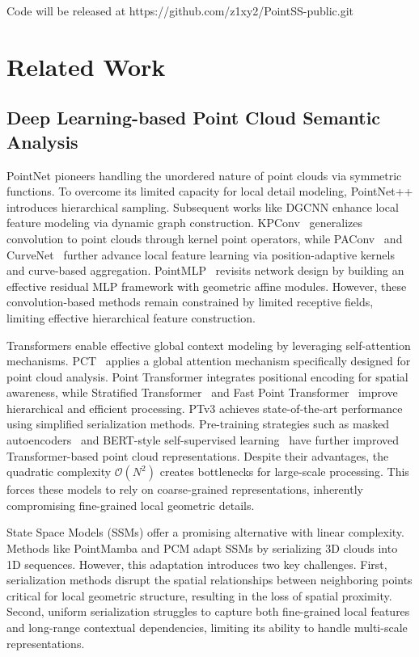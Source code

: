 \documentclass[a4paper,fleqn]{cas-sc}
\begin{document}
Code will be released at https://github.com/z1xy2/PointSS-public.git


\section{Related Work}
\subsection{Deep Learning-based Point Cloud Semantic Analysis}
PointNet \cite{pointnet} pioneers handling the unordered nature of point clouds via symmetric functions. To overcome its limited capacity for local detail modeling, PointNet++ \cite{PointNet++} introduces hierarchical sampling. Subsequent works like DGCNN \cite{DGCNN} enhance local feature modeling via dynamic graph construction. KPConv~\cite{KPConv} generalizes convolution to point clouds through kernel point operators, while PAConv~\cite{paconv} and CurveNet~\cite{curvenet} further advance local feature learning via position-adaptive kernels and curve-based aggregation. PointMLP~\cite{pointmlp} revisits network design by building an effective residual MLP framework with geometric affine modules. However, these convolution-based methods remain constrained by limited receptive fields, limiting effective hierarchical feature construction.

Transformers enable effective global context modeling by leveraging self-attention mechanisms. PCT~\cite{PCT} applies a global attention mechanism specifically designed for point cloud analysis. Point Transformer \cite{pt} integrates positional encoding for spatial awareness, while Stratified Transformer~\cite{stratified_transformer} and Fast Point Transformer~\cite{fast_point_transformer} improve hierarchical and efficient processing. PTv3 \cite{ptv3} achieves state-of-the-art performance using simplified serialization methods. Pre-training strategies such as masked autoencoders~\cite{pointmae} and BERT-style self-supervised learning~\cite{Point-BERT} have further improved Transformer-based point cloud representations. Despite their advantages, the quadratic complexity $\mathcal{O}(N^2)$ creates bottlenecks for large-scale processing. This forces these models to rely on coarse-grained representations, inherently compromising fine-grained local geometric
details.

State Space Models (SSMs) \cite{Mamba} offer a promising alternative with linear complexity. Methods like PointMamba \cite{PointMamba} and PCM \cite{pcm} adapt SSMs by serializing 3D clouds into 1D sequences.   However, this adaptation introduces two key challenges. First,
serialization methods disrupt the spatial relationships between
neighboring points critical for local geometric structure, resulting in
the loss of spatial proximity. Second, uniform serialization struggles to
capture both fine-grained local features and long-range contextual
dependencies, limiting its ability to handle multi-scale representations.
\end{document}
